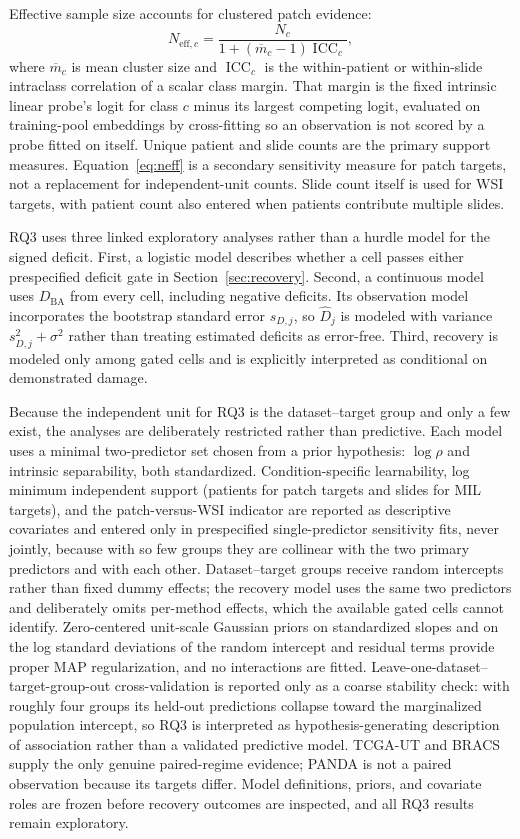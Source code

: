 \documentclass[11pt]{article}
\begin{document}
Effective sample size accounts for clustered patch evidence:
\begin{equation}
  N_{\mathrm{eff},c}=\frac{N_c}{1+(\overline m_c-1)\operatorname{ICC}_c},
  \label{eq:neff}
\end{equation}
where $\overline m_c$ is mean cluster size and $\operatorname{ICC}_c$ is the within-patient or within-slide intraclass correlation of a scalar class margin. That margin is the fixed intrinsic linear probe's logit for class $c$ minus its largest competing logit, evaluated on training-pool embeddings by cross-fitting so an observation is not scored by a probe fitted on itself. Unique patient and slide counts are the primary support measures. Equation~\eqref{eq:neff} is a secondary sensitivity measure for patch targets, not a replacement for independent-unit counts. Slide count itself is used for WSI targets, with patient count also entered when patients contribute multiple slides.

RQ3 uses three linked exploratory analyses rather than a hurdle model for the signed deficit. First, a logistic model describes whether a cell passes either prespecified deficit gate in Section~\ref{sec:recovery}. Second, a continuous model uses $D_{\mathrm{BA}}$ from every cell, including negative deficits. Its observation model incorporates the bootstrap standard error $s_{D,j}$, so $\widehat D_j$ is modeled with variance $s_{D,j}^2+\sigma^2$ rather than treating estimated deficits as error-free. Third, recovery is modeled only among gated cells and is explicitly interpreted as conditional on demonstrated damage.

Because the independent unit for RQ3 is the dataset--target group and only a few exist, the analyses are deliberately restricted rather than predictive. Each model uses a minimal two-predictor set chosen from a prior hypothesis: $\log\rho$ and intrinsic separability, both standardized. Condition-specific learnability, log minimum independent support (patients for patch targets and slides for MIL targets), and the patch-versus-WSI indicator are reported as descriptive covariates and entered only in prespecified single-predictor sensitivity fits, never jointly, because with so few groups they are collinear with the two primary predictors and with each other. Dataset--target groups receive random intercepts rather than fixed dummy effects; the recovery model uses the same two predictors and deliberately omits per-method effects, which the available gated cells cannot identify. Zero-centered unit-scale Gaussian priors on standardized slopes and on the log standard deviations of the random intercept and residual terms provide proper MAP regularization, and no interactions are fitted. Leave-one-dataset--target-group-out cross-validation is reported only as a coarse stability check: with roughly four groups its held-out predictions collapse toward the marginalized population intercept, so RQ3 is interpreted as hypothesis-generating description of association rather than a validated predictive model. TCGA-UT and BRACS supply the only genuine paired-regime evidence; PANDA is not a paired observation because its targets differ. Model definitions, priors, and covariate roles are frozen before recovery outcomes are inspected, and all RQ3 results remain exploratory.
\end{document}
